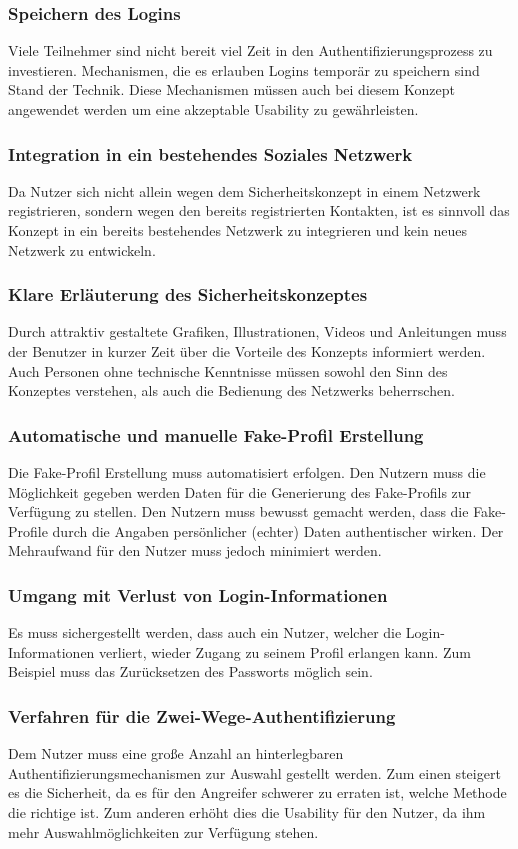 \documentclass{sigchi}
\begin{document}
\subsubsection{Speichern des Logins}
Viele Teilnehmer sind nicht bereit viel Zeit in den Authentifizierungsprozess zu investieren. Mechanismen, die es erlauben Logins temporär zu speichern sind Stand der Technik. Diese Mechanismen müssen auch bei diesem Konzept angewendet werden um eine akzeptable Usability zu gewährleisten.

\subsubsection{Integration in ein bestehendes Soziales Netzwerk}
Da Nutzer sich nicht allein wegen dem Sicherheitskonzept in einem Netzwerk registrieren, sondern wegen den bereits registrierten Kontakten, ist es sinnvoll das Konzept in ein bereits bestehendes Netzwerk zu integrieren und kein neues Netzwerk zu entwickeln.
\subsubsection{Klare Erläuterung des Sicherheitskonzeptes}
Durch attraktiv gestaltete Grafiken, Illustrationen, Videos und Anleitungen muss der Benutzer in kurzer Zeit über die Vorteile des Konzepts informiert werden. Auch Personen ohne technische Kenntnisse müssen sowohl den Sinn des Konzeptes verstehen, als auch die Bedienung des Netzwerks beherrschen.
\subsubsection{Automatische und manuelle Fake-Profil Erstellung}
Die Fake-Profil Erstellung muss automatisiert erfolgen. Den Nutzern muss die Möglichkeit gegeben werden Daten für die Generierung des Fake-Profils zur Verfügung zu stellen. Den Nutzern muss bewusst gemacht werden, dass die Fake-Profile durch die Angaben persönlicher (echter) Daten authentischer wirken. Der Mehraufwand für den Nutzer muss jedoch minimiert werden.
\subsubsection{Umgang mit Verlust von Login-Informationen}
Es muss sichergestellt werden, dass auch ein Nutzer, welcher die Login-Informationen verliert, wieder Zugang zu seinem Profil erlangen kann. Zum Beispiel muss das Zurücksetzen des Passworts möglich sein.
\subsubsection{Verfahren für die Zwei-Wege-Authentifizierung}
Dem Nutzer muss eine große Anzahl an hinterlegbaren Authentifizierungsmechanismen zur Auswahl gestellt werden. Zum einen steigert es die Sicherheit, da es für den Angreifer schwerer zu erraten ist, welche Methode die richtige ist. Zum anderen erhöht dies die Usability für den Nutzer, da ihm mehr Auswahlmöglichkeiten zur Verfügung stehen.
\end{document}
